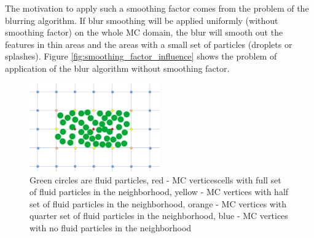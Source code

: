 The motivation to apply such a smoothing factor comes from the problem of the blurring algorithm. If blur smoothing will be applied uniformly (without smoothing factor) on the whole MC domain, the blur will smooth out the features in thin areas and the areas with a small set of particles (droplets or splashes). Figure \ref{fig:smoothing_factor_influence} shows the problem of application of the blur algorithm without smoothing factor.
\begin{figure}[H]
	\begin{center}
		\includegraphics[width=0.5\textwidth]{figures/SmoothingFactorPictureExplenation.png}		
		\caption{Green circles are fluid particles, red - MC verticescells with full set of fluid particles in the neighborhood, yellow -  MC vertices with half set of fluid particles in the neighborhood, orange - MC vertices with quarter set of fluid particles in the neighborhood, blue - MC vertices with no fluid particles in the neighborhood}
		\label{fig:sf_example}
	\end{center}
\end{figure}

